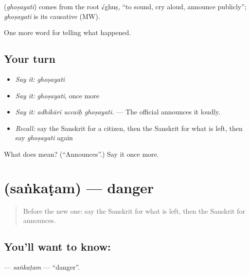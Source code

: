 \begin{cousinweb}
\textbf{} (\emph{ghoṣayati}) comes from the root √ghuṣ, \textquotedblleft{}to sound, cry aloud, announce publicly\textquotedblright{}; \emph{ghoṣayati} is its causative (MW).
\end{cousinweb}

\begin{grammarlens}[title={What you've built}]
One more word for telling what happened.
\end{grammarlens}

\subsection*{Your turn}
\begin{itemize}
\raggedright
  \item \emph{Say it:} \emph{ghoṣayati}
  \item \emph{Say it:} \emph{ghoṣayati}, once more
  \item \emph{Say it:} \emph{adhikārī uccaiḥ ghoṣayati.} — The official announces it loudly.
  \item \emph{Recall:} say the Sanskrit for a citizen, then the Sanskrit for what is left, then say \emph{ghoṣayati} again
\end{itemize}

\begin{tcolorbox}[breakable,colback=teal!4,colframe=teal!35!black,title={Before you move on}]
What does  mean? (\textquotedblleft{}Announces\textquotedblright{}.) Say it once more.
\end{tcolorbox}
\section[\texorpdfstring{\sk{संकटम्} (saṅkaṭam)}{संकटम् (saṅkaṭam)}]{ (saṅkaṭam) — danger}

\label{lesson:SA-C299-sankatam}



\begin{quote}
Before the new one: say the Sanskrit for what is left, then the Sanskrit for announces.
\end{quote}

\subsection*{You'll want to know: }
\textbf{} — \emph{saṅkaṭam} — \textquotedblleft{}danger\textquotedblright{}.

